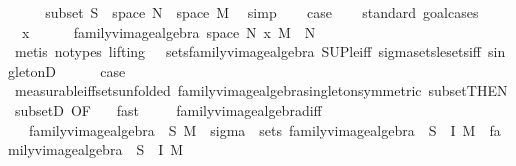 \begin{isabellebody}
\ {}\isanewline
\ \ \isamarkupfalse%
\ subset{\isacharcolon}{\kern0pt}\ {\isachardoublequoteopen}S\ {\isasymsubseteq}\ space\ N\ {\isasymrightarrow}\ space\ M{\isachardoublequoteclose}\ \isamarkupfalse%
\ simp\isanewline
\ \ \isamarkupfalse%
\ {\isacharquery}{\kern0pt}case\isanewline
\ \ \isamarkupfalse%
\ {\isacharparenleft}{\kern0pt}standard{\isacharcomma}{\kern0pt}\ goal{\isacharunderscore}{\kern0pt}cases{\isacharparenright}{\kern0pt}\isanewline
\ \ \ \ \isamarkupfalse%
\ {\isacharparenleft}{\kern0pt}{}\ x{\isacharparenright}{\kern0pt}\isanewline
\ \ \ \ \isamarkupfalse%
\ {\isachardoublequoteopen}family{\isacharunderscore}{\kern0pt}vimage{\isacharunderscore}{\kern0pt}algebra\ {\isacharparenleft}{\kern0pt}space\ N{\isacharparenright}{\kern0pt}\ {\isacharbraceleft}{\kern0pt}x{\isacharbraceright}{\kern0pt}\ M\ {\isasymsubseteq}\ N{\isachardoublequoteclose}\ \isamarkupfalse%
\ {\isacharparenleft}{\kern0pt}metis\ {\isacharparenleft}{\kern0pt}no{\isacharunderscore}{\kern0pt}types{\isacharcomma}{\kern0pt}\ lifting{\isacharparenright}{\kern0pt}\ {}\ {}\ sets{\isacharunderscore}{\kern0pt}family{\isacharunderscore}{\kern0pt}vimage{\isacharunderscore}{\kern0pt}algebra\ SUP{\isacharunderscore}{\kern0pt}le{\isacharunderscore}{\kern0pt}iff\ sigma{\isacharunderscore}{\kern0pt}sets{\isacharunderscore}{\kern0pt}le{\isacharunderscore}{\kern0pt}sets{\isacharunderscore}{\kern0pt}iff\ singletonD{\isacharparenright}{\kern0pt}\isanewline
\ \ \ \ \isamarkupfalse%
\ {\isacharquery}{\kern0pt}case\ \isamarkupfalse%
\ measurable{\isacharunderscore}{\kern0pt}iff{\isacharunderscore}{\kern0pt}sets{\isacharbrackleft}{\kern0pt}unfolded\ family{\isacharunderscore}{\kern0pt}vimage{\isacharunderscore}{\kern0pt}algebra{\isacharunderscore}{\kern0pt}singleton{\isacharbrackleft}{\kern0pt}symmetric{\isacharbrackright}{\kern0pt}{\isacharbrackright}{\kern0pt}\ subset{\isacharbrackleft}{\kern0pt}THEN\ subsetD{\isacharcomma}{\kern0pt}\ OF\ {}{\isacharbrackright}{\kern0pt}\ \isamarkupfalse%
\ fast\ \isanewline
\ \ \isamarkupfalse%
\isanewline
{}\isamarkupfalse%
%
\endisatagproof
{\isafoldproof}%
%
\isadelimproof
\isanewline
%
\endisadelimproof
\isanewline
{}\isamarkupfalse%
\ family{\isacharunderscore}{\kern0pt}vimage{\isacharunderscore}{\kern0pt}algebra{\isacharunderscore}{\kern0pt}diff{\isacharcolon}{\kern0pt}\isanewline
\ \ \ {\isachardoublequoteopen}family{\isacharunderscore}{\kern0pt}vimage{\isacharunderscore}{\kern0pt}algebra\ {\isasymOmega}\ S\ M\ {\isacharequal}{\kern0pt}\ sigma\ {\isasymOmega}\ {\isacharparenleft}{\kern0pt}sets\ {\isacharparenleft}{\kern0pt}family{\isacharunderscore}{\kern0pt}vimage{\isacharunderscore}{\kern0pt}algebra\ {\isasymOmega}\ {\isacharparenleft}{\kern0pt}S\ {\isacharminus}{\kern0pt}\ I{\isacharparenright}{\kern0pt}\ M{\isacharparenright}{\kern0pt}\ {\isasymunion}\ family{\isacharunderscore}{\kern0pt}vimage{\isacharunderscore}{\kern0pt}algebra\ {\isasymOmega}\ {\isacharparenleft}{\kern0pt}S\ {\isasyminter}\ I{\isacharparenright}{\kern0pt}\ M{\isacharparenright}{\kern0pt}{\isachardoublequoteclose}\isanewline

\end{isabellebody}
